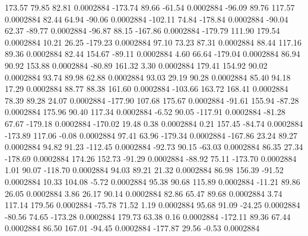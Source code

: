       173.57       79.85       82.81     0.0002884
     -173.74       89.66      -61.54     0.0002884
      -96.09       89.76      117.57     0.0002884
       82.44       64.94      -90.06     0.0002884
     -102.11       74.84     -178.84     0.0002884
      -90.04       62.37      -89.77     0.0002884
      -96.87       88.15     -167.86     0.0002884
     -179.79      111.90      179.54     0.0002884
       10.21       26.25     -179.23     0.0002884
       97.10       73.23       87.31     0.0002884
       88.44      117.16       89.36     0.0002884
       82.44      154.67      -89.11     0.0002884
        4.60       66.64     -179.04     0.0002884
       86.94       90.92      153.88     0.0002884
      -80.89      161.32        3.30     0.0002884
      179.41      154.92       90.02     0.0002884
       93.74       89.98       62.88     0.0002884
       93.03       29.19       90.28     0.0002884
       85.40       94.18       17.29     0.0002884
       88.77       88.38      161.60     0.0002884
     -103.66      163.72      168.41     0.0002884
       78.39       89.28       24.07     0.0002884
     -177.90      107.68      175.67     0.0002884
      -91.61      155.94      -87.28     0.0002884
      175.96       90.40      117.34     0.0002884
       -6.52       90.05     -117.91     0.0002884
      -81.28       67.67     -179.18     0.0002884
     -170.02       19.48        0.38     0.0002884
        0.21      157.45      -84.74     0.0002884
     -173.89      117.06       -0.08     0.0002884
       97.41       63.96     -179.34     0.0002884
     -167.86       23.24       89.27     0.0002884
       94.82       91.23     -112.45     0.0002884
      -92.73       90.15      -63.03     0.0002884
       86.35       27.34     -178.69     0.0002884
      174.26      152.73      -91.29     0.0002884
      -88.92       75.11     -173.70     0.0002884
        1.01       90.07     -118.70     0.0002884
       94.03       89.21       21.32     0.0002884
       86.98      156.39      -91.52     0.0002884
       10.33      104.08       -5.72     0.0002884
       95.38       90.68      115.89     0.0002884
      -11.21       89.86       26.05     0.0002884
        3.86       26.17       90.14     0.0002884
       82.86       65.47       89.68     0.0002884
        3.74      117.14      179.56     0.0002884
      -75.78       71.52        1.19     0.0002884
       95.68       91.09      -24.25     0.0002884
      -80.56       74.65     -173.28     0.0002884
      179.73       63.38        0.16     0.0002884
     -172.11       89.36       67.44     0.0002884
       86.50      167.01      -94.45     0.0002884
     -177.87       29.56       -0.53     0.0002884
